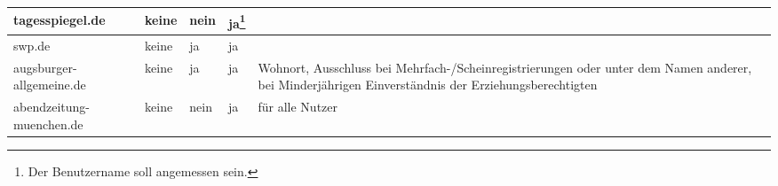 \begin{longtable}{p{24mm}p{20mm}p{10mm}p{10mm}p{60mm}}
tagesspiegel.de %
& keine
& \centerline{nein}
& \centerline{ja\footnote{Der Benutzername soll angemessen sein.}}
&
\\\midrule

swp.de %
& keine
& \centerline{ja}
& \centerline{ja}
&
\\\midrule

augsburger-allgemeine.de %
& keine
& \centerline{ja}
& \centerline{ja}
& Wohnort, Ausschluss bei Mehrfach-/Scheinregistrierungen oder unter dem Namen
  anderer, bei Minderjährigen Einverständnis der Erziehungsberechtigten
  
\\\midrule

abendzeitung-muenchen.de %
& keine
& \centerline{nein}
& \centerline{ja}
& für alle Nutzer
\end{longtable}
\endgroup

